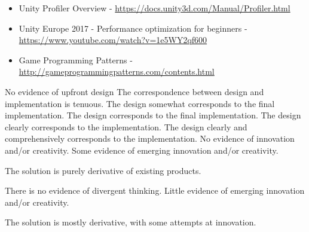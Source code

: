 \documentclass{../../fal_assignment}
\begin{document}
\begin{itemize}
     \item Unity Profiler Overview - \url{https://docs.unity3d.com/Manual/Profiler.html}
     \item Unity Europe 2017 - Performance optimization for beginners -  \url{https://www.youtube.com/watch?v=1e5WY2qf600}
     \item Game Programming Patterns - \url{http://gameprogrammingpatterns.com/contents.html}
\end{itemize}

\begin{markingrubric}
%
        \grade\fail No evidence of upfront design
        \grade The correspondence between design and implementation is tenuous.
        \grade The design somewhat corresponds to the final implementation.
        \grade The design corresponds to the final implementation.
        \grade The design clearly corresponds to the implementation.
        \grade The design clearly and comprehensively corresponds to the implementation.
%
        \grade\fail No evidence of innovation and/or creativity.
        \grade Some evidence of emerging innovation and/or creativity.
            \par The solution is purely derivative of existing products.
            \par There is no evidence of divergent thinking.
        \grade Little evidence of emerging innovation and/or creativity.
            \par The solution is mostly derivative, with some attempts at innovation.

\end{markingrubric}
\end{document}

